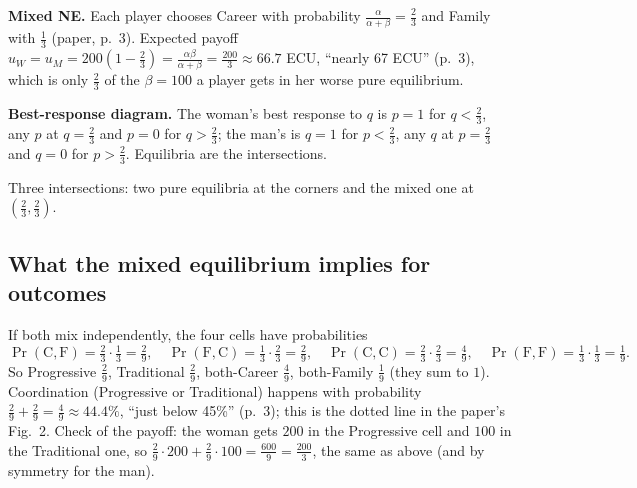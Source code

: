 \documentclass[11pt,a4paper]{article}
\newcommand{\answer}[1]{\begin{tcolorbox}[colback=ans!5,colframe=ans,boxrule=0.6pt,
  left=5pt,right=5pt,top=3pt,bottom=3pt]#1\end{tcolorbox}}
\newcommand{\C}{\mathrm{C}}
\newcommand{\Fm}{\mathrm{F}}
\begin{document}
\answer{\textbf{Mixed NE.} Each player chooses Career with probability $\tfrac{\alpha}{\alpha+\beta}=\tfrac23$
and Family with $\tfrac13$ (paper, p.~3). Expected payoff
$u_W=u_M=200\left(1-\tfrac23\right)=\tfrac{\alpha\beta}{\alpha+\beta}=\tfrac{200}{3}\approx66.7$ ECU,
``nearly 67 ECU'' (p.~3), which is only $\tfrac23$ of the $\beta=100$ a player gets in her worse pure
equilibrium.}

\textbf{Best-response diagram.} The woman's best response to $q$ is $p=1$ for $q<\tfrac23$, any $p$ at
$q=\tfrac23$ and $p=0$ for $q>\tfrac23$; the man's is $q=1$ for $p<\tfrac23$, any $q$ at
$p=\tfrac23$ and $q=0$ for $p>\tfrac23$. Equilibria are the intersections.

\begin{center}

{\footnotesize Three intersections: two pure equilibria at the corners and the mixed one at $(\tfrac23,\tfrac23)$.}
\end{center}

\subsection{What the mixed equilibrium implies for outcomes}
If both mix independently, the four cells have probabilities
\[
\Pr(\C,\Fm)=\tfrac23\cdot\tfrac13=\tfrac29,\quad
\Pr(\Fm,\C)=\tfrac13\cdot\tfrac23=\tfrac29,\quad
\Pr(\C,\C)=\tfrac23\cdot\tfrac23=\tfrac49,\quad
\Pr(\Fm,\Fm)=\tfrac13\cdot\tfrac13=\tfrac19 .
\]
So Progressive $\tfrac29$, Traditional $\tfrac29$, both-Career $\tfrac49$, both-Family $\tfrac19$ (they
sum to $1$). Coordination (Progressive or Traditional) happens with probability
$\tfrac29+\tfrac29=\tfrac49\approx44.4\%$, ``just below 45\%'' (p.~3); this is the dotted line in the
paper's Fig.~2. Check of the payoff: the woman gets $200$ in the Progressive cell and $100$ in the Traditional one,
so $\tfrac29\cdot200+\tfrac29\cdot100=\tfrac{600}{9}=\tfrac{200}{3}$, the same as above (and by
symmetry for the man).
\end{document}

